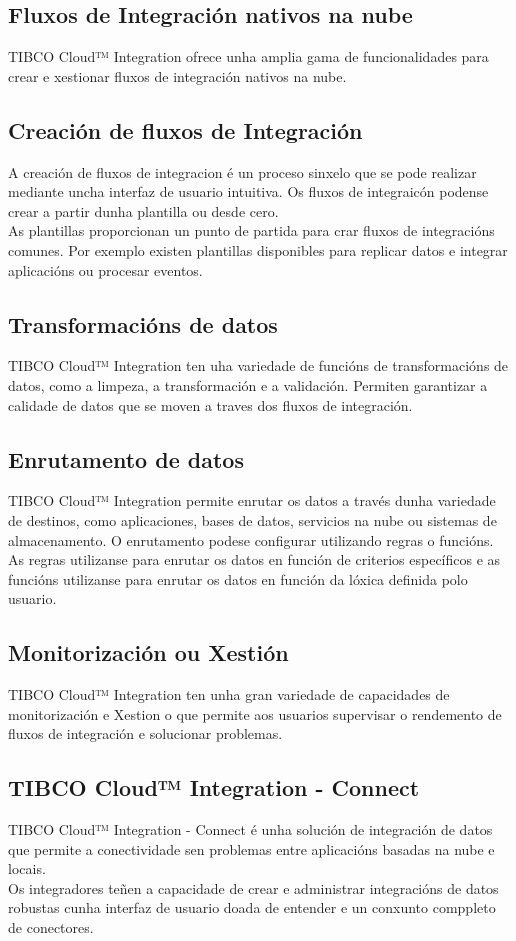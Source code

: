 \begin{flushleft}
\section{Fluxos de Integración nativos na nube}
TIBCO Cloud™ Integration ofrece unha amplia gama de funcionalidades para crear e xestionar fluxos de integración nativos na nube.
\subsection{Creación de fluxos de Integración}
A creación de fluxos de integracion é un proceso sinxelo que se pode realizar mediante uncha interfaz de usuario intuitiva. Os fluxos de integraicón podense crear a partir dunha plantilla ou desde cero.\\
As plantillas proporcionan un punto de partida para crar fluxos de integracións comunes. Por exemplo existen plantillas disponibles para replicar datos e integrar aplicacións ou procesar eventos.
\subsection{Transformacións de datos}
TIBCO Cloud™ Integration ten uha variedade de funcións de transformacións de datos, como a limpeza, a transformación e a validación. Permiten garantizar a calidade de datos que se moven a traves dos fluxos de integración.
\subsection{Enrutamento de datos}
TIBCO Cloud™ Integration permite enrutar os datos a través dunha variedade de destinos, como aplicaciones, bases de datos, servicios na nube ou sistemas de almacenamento.
O enrutamento podese configurar utilizando regras o funcións. As regras utilizanse para enrutar os datos en función de criterios específicos e as funcións utilizanse para enrutar os datos en función da lóxica definida polo usuario.
\subsection{Monitorización ou Xestión}
TIBCO Cloud™ Integration ten unha gran variedade de capacidades de monitorización e Xestion o que permite aos usuarios supervisar o rendemento de fluxos de integración e solucionar problemas.

\subsection{TIBCO Cloud™ Integration - Connect}
TIBCO Cloud™ Integration - Connect é  unha solución de integración de datos que permite a conectividade sen problemas entre aplicacións basadas na nube e locais.\\
Os integradores teñen a capacidade de crear e administrar integracións de datos robustas cunha interfaz de usuario doada de entender e un conxunto comppleto de conectores.\\

\end{flushleft}

